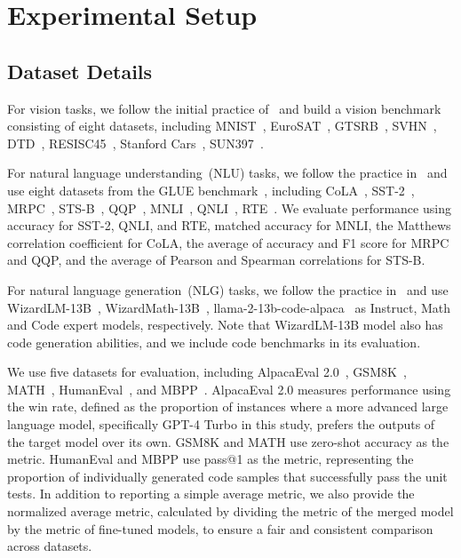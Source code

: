 \section{Experimental Setup}
\label{apz:exp_setup}

\subsection{Dataset Details}
\label{apx:dataset}
For vision tasks, we follow the initial practice of~\citep{ilharco2022editing} and build a vision benchmark consisting of eight datasets, including MNIST~\citep{lecun2010mnist}, EuroSAT~\citep{helber2019eurosat}, GTSRB~\citep{stallkamp2011german}, SVHN~\citep{netzer2011reading}, DTD~\citep{cimpoi2014describing}, RESISC45~\citep{cheng2017remote}, Stanford Cars~\citep{krause20133d}, SUN397~\citep{xiao2016sun}. 

For natural language understanding~(NLU) tasks, we follow the practice in~\citet{yu2024language} and use eight datasets from the GLUE benchmark~\citep{wang2018glue}, 
including CoLA~\citep{warstadt2018neural}, SST-2~\citep{socher2013recursive}, MRPC~\citep{dolan2005automatically}, STS-B~\citep{cer2017semeval}, QQP~\citep{iyer2017first}, MNLI~\citep{williams2017broad}, QNLI~\citep{wang2018glue, rajpurkar2016squad}, RTE~\citep{wang2018glue, dagan2005pascal,bar2006second,giampiccolo2007third,bentivogli2009fifth}.
We evaluate performance using accuracy for SST-2, QNLI, and RTE, matched accuracy for MNLI, the Matthews correlation coefficient for CoLA, the average of accuracy and F1 score for MRPC and QQP, and the average of Pearson and Spearman correlations for STS-B.


For natural language generation~(NLG) tasks, we follow the practice in~\citep{yu2024extend} and use WizardLM-13B~\citep{xu2023wizardlm}, WizardMath-13B~\citep{luo2023wizardmath}, llama-2-13b-code-alpaca~\citep{chaudhary2023code} as Instruct, Math and Code expert models, respectively. Note that WizardLM-13B model also has code generation abilities, and we include code benchmarks in its evaluation. 

We use five datasets for evaluation, including AlpacaEval 2.0~\citep{dubois2024length}, GSM8K~\citep{cobbe2021training}, MATH~\citep{hendrycks2020measuring}, HumanEval~\citep{chen2021evaluating}, and MBPP~\citep{austin2021program}. AlpacaEval 2.0 measures performance using the win rate, defined as the proportion of instances where a more advanced large language model, specifically GPT-4 Turbo in this study, prefers the outputs of the target model over its own. GSM8K and MATH use zero-shot accuracy as the metric. HumanEval and MBPP use pass@1 as the metric, representing the proportion of individually generated code samples that successfully pass the unit tests. In addition to reporting a simple average metric, we also provide the normalized average metric, calculated by dividing the metric of the merged model by the metric of fine-tuned models, to ensure a fair and consistent comparison across datasets.

